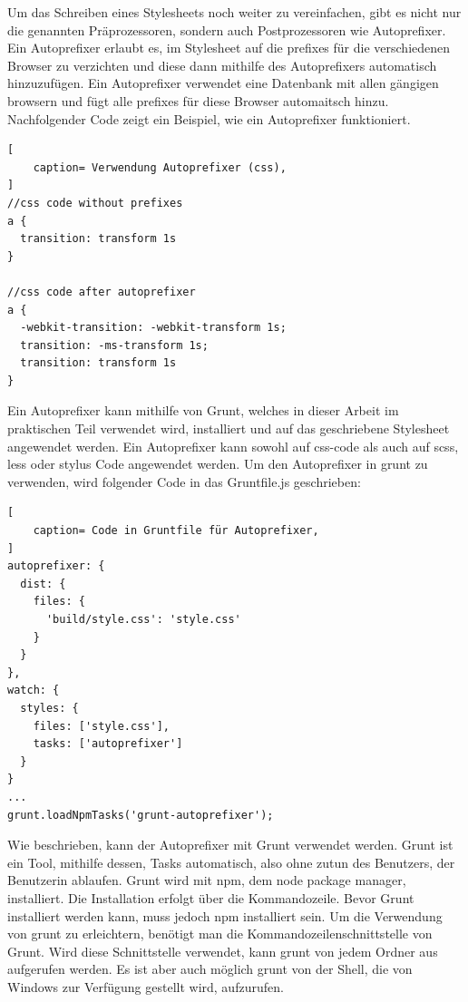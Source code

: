 Um das Schreiben eines Stylesheets noch weiter zu vereinfachen, gibt es nicht nur die genannten Präprozessoren, sondern auch Postprozessoren wie \glqq{}Autoprefixer\grqq{}. Ein Autoprefixer erlaubt es, im Stylesheet auf die prefixes für die verschiedenen Browser zu verzichten und diese dann mithilfe des Autoprefixers automatisch hinzuzufügen. Ein Autoprefixer verwendet eine Datenbank mit allen gängigen browsern und fügt alle prefixes für diese Browser automaitsch hinzu.
Nachfolgender Code zeigt ein Beispiel, wie ein Autoprefixer funktioniert.
\begin{lstlisting}[
	caption= Verwendung Autoprefixer (css),
]
//css code without prefixes
a {
  transition: transform 1s
}

//css code after autoprefixer
a {
  -webkit-transition: -webkit-transform 1s;
  transition: -ms-transform 1s;
  transition: transform 1s
}
\end{lstlisting}
Ein Autoprefixer kann mithilfe von Grunt, welches in dieser Arbeit im praktischen Teil verwendet wird, installiert und auf das geschriebene Stylesheet angewendet werden. Ein Autoprefixer kann sowohl auf css-code als auch auf scss, less oder stylus Code angewendet werden.\newline
Um den Autoprefixer in grunt zu verwenden, wird folgender Code in das Gruntfile.js geschrieben:\autocite[]{Sitnik.2013}
\begin{lstlisting}[
	caption= Code in Gruntfile für Autoprefixer,
]
autoprefixer: {
  dist: {
    files: {
      'build/style.css': 'style.css'
    }
  }
},
watch: {
  styles: {
    files: ['style.css'],
    tasks: ['autoprefixer']
  }
}
...
grunt.loadNpmTasks('grunt-autoprefixer');
\end{lstlisting}
Wie beschrieben, kann der Autoprefixer mit Grunt verwendet werden. Grunt ist ein Tool, mithilfe dessen, Tasks automatisch, also ohne zutun des Benutzers, der Benutzerin ablaufen. Grunt wird mit npm, dem node package manager, installiert.\newline
Die Installation erfolgt über die Kommandozeile. Bevor Grunt installiert werden kann, muss jedoch npm installiert sein.\newline
Um die Verwendung von grunt zu erleichtern, benötigt man die Kommandozeilenschnittstelle von Grunt. Wird diese Schnittstelle verwendet, kann grunt von jedem Ordner aus aufgerufen werden. Es ist aber auch möglich grunt von der Shell, die von Windows zur Verfügung gestellt wird, aufzurufen.\newline\newline
